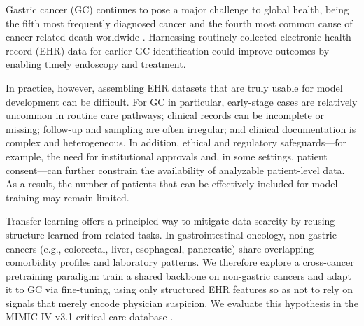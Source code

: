 \documentclass[journal,article,submit,pdftex,moreauthors]{Definitions/mdpi}
\begin{document}
{\color{red}
Gastric cancer (GC) continues to pose a major challenge to global health, being the fifth most frequently diagnosed cancer and the fourth most common cause of cancer-related death worldwide \citep{sung2021global}. Harnessing routinely collected electronic health record (EHR) data for earlier GC identification could improve outcomes by enabling timely endoscopy and treatment.

In practice, however, assembling EHR datasets that are truly usable for model development can be difficult. For GC in particular, early-stage cases are relatively uncommon in routine care pathways; clinical records can be incomplete or missing; follow-up and sampling are often irregular; and clinical documentation is complex and heterogeneous. In addition, ethical and regulatory safeguards---for example, the need for institutional approvals and, in some settings, patient consent---can further constrain the availability of analyzable patient-level data. As a result, the number of patients that can be effectively included for model training may remain limited.

Transfer learning offers a principled way to mitigate data scarcity by reusing structure learned from related tasks. In gastrointestinal oncology, non-gastric cancers (e.g., colorectal, liver, esophageal, pancreatic) share overlapping comorbidity profiles and laboratory patterns. We therefore explore a cross-cancer pretraining paradigm: train a shared backbone on non-gastric cancers and adapt it to GC via fine-tuning, using only structured EHR features so as not to rely on signals that merely encode physician suspicion. We evaluate this hypothesis in the MIMIC-IV v3.1 critical care database \citep{Johnson2024MIMICIV}.
}
\end{document}
